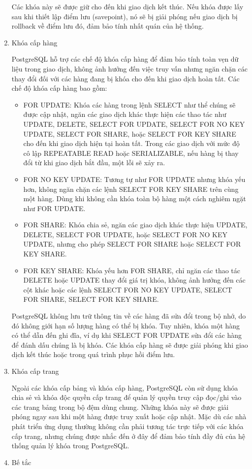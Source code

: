 \begin{enumerate}
    \hspace{1cm}Các khóa này sẽ được giữ cho đến khi giao dịch kết thúc. Nếu khóa được lấy sau khi thiết lập điểm lưu (savepoint), nó sẽ bị giải phóng nếu giao dịch bị rollback về điểm lưu đó, đảm bảo tính nhất quán của hệ thống.
    \item Khóa cấp hàng

    \hspace{1cm}PostgreSQL hỗ trợ các chế độ khóa cấp hàng để đảm bảo tính toàn vẹn dữ liệu trong giao dịch, không ảnh hưởng đến việc truy vấn nhưng ngăn chặn các thay đổi đối với các hàng đang bị khóa cho đến khi giao dịch hoàn tất. Các chế độ khóa cấp hàng bao gồm:
    \begin{itemize}
        \item FOR UPDATE: Khóa các hàng trong lệnh SELECT như thể chúng sẽ được cập nhật, ngăn các giao dịch khác thực hiện các thao tác như UPDATE, DELETE, SELECT FOR UPDATE, SELECT FOR NO KEY UPDATE, SELECT FOR SHARE, hoặc SELECT FOR KEY SHARE cho đến khi giao dịch hiện tại hoàn tất. Trong các giao dịch với mức độ cô lập REPEATABLE READ hoặc SERIALIZABLE, nếu hàng bị thay đổi từ khi giao dịch bắt đầu, một lỗi sẽ xảy ra.
        \item FOR NO KEY UPDATE: Tương tự như FOR UPDATE nhưng khóa yếu hơn, không ngăn chặn các lệnh SELECT FOR KEY SHARE trên cùng một hàng. Dùng khi không cần khóa toàn bộ hàng một cách nghiêm ngặt như FOR UPDATE.
        \item FOR SHARE: Khóa chia sẻ, ngăn các giao dịch khác thực hiện UPDATE, DELETE, SELECT FOR UPDATE, hoặc SELECT FOR NO KEY UPDATE, nhưng cho phép SELECT FOR SHARE hoặc SELECT FOR KEY SHARE.
        \item FOR KEY SHARE: Khóa yếu hơn FOR SHARE, chỉ ngăn các thao tác DELETE hoặc UPDATE thay đổi giá trị khóa, không ảnh hưởng đến các cột khác hoặc các lệnh SELECT FOR NO KEY UPDATE, SELECT FOR SHARE, SELECT FOR KEY SHARE.
    \end{itemize}

    \hspace{1cm}PostgreSQL không lưu trữ thông tin về các hàng đã sửa đổi trong bộ nhớ, do đó không giới hạn số lượng hàng có thể bị khóa. Tuy nhiên, khóa một hàng có thể dẫn đến ghi đĩa, ví dụ khi SELECT FOR UPDATE sửa đổi các hàng để đánh dấu chúng là bị khóa. Các khóa cấp hàng sẽ được giải phóng khi giao dịch kết thúc hoặc trong quá trình phục hồi điểm lưu.
    \item Khóa cấp trang

    \hspace{1cm}Ngoài các khóa cấp bảng và khóa cấp hàng, PostgreSQL còn sử dụng khóa chia sẻ và khóa độc quyền cấp trang để quản lý quyền truy cập đọc/ghi vào các trang bảng trong bộ đệm dùng chung. Những khóa này sẽ được giải phóng ngay sau khi một hàng được truy xuất hoặc cập nhật. Mặc dù các nhà phát triển ứng dụng thường không cần phải tương tác trực tiếp với các khóa cấp trang, nhưng chúng được nhắc đến ở đây để đảm bảo tính đầy đủ của hệ thống quản lý khóa trong PostgreSQL.
    \item Bế tắc


\end{enumerate}
